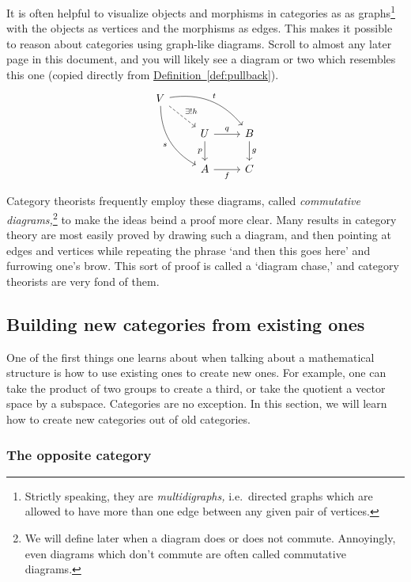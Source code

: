 \documentclass[notes.tex]{subfiles}
\begin{document}
It is often helpful to visualize objects and morphisms in categories as as graphs\footnote{Strictly speaking, they are \emph{multidigraphs,} i.e.\ directed graphs which are allowed to have more than one edge between any given pair of vertices.} with the objects as vertices and the morphisms as edges. This makes it possible to reason about categories using graph-like diagrams. Scroll to almost any later page in this document, and you will likely see a diagram or two which resembles this one (copied directly from \hyperref[def:pullback]{Definition~\ref*{def:pullback}}).
\begin{equation*}
  \begin{tikzcd}
    V
    \arrow[rrd, bend left, "t"]
    \arrow[rd, dashed, "\exists!h"]
    \arrow[rdd, bend right, swap, "s"]
    \\
    & U
    \arrow[r, "q"]
    \arrow[d, swap, "p"]
    & B
    \arrow[d, "g"]
    \\
    & A
    \arrow[r, swap, "f"]
    & C
  \end{tikzcd}
\end{equation*}

Category theorists frequently employ these diagrams, called \emph{commutative diagrams,}\footnote{We will define later when a diagram does or does not commute. Annoyingly, even diagrams which don't commute are often called commutative diagrams.} to make the ideas beind a proof more clear. Many results in category theory are most easily proved by drawing such a diagram, and then pointing at edges and vertices while repeating the phrase `and then this goes here' and furrowing one's brow. This sort of proof is called a `diagram chase,' and category theorists are very fond of them.


\subsection{Building new categories from existing ones}

One of the first things one learns about when talking about a mathematical structure is how to use existing ones to create new ones. For example, one can take the product of two groups to create a third, or take the quotient a vector space by a subspace. Categories are no exception. In this section, we will learn how to create new categories out of old categories.


\subsubsection{The opposite category}
\end{document}
